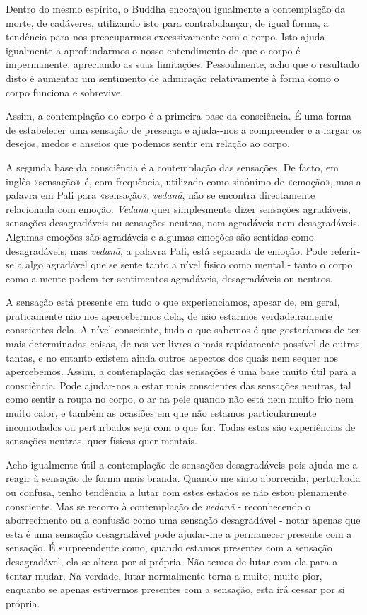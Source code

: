 Dentro do mesmo espírito, o Buddha encorajou igualmente a contemplação
da morte, de cadáveres, utilizando isto para contrabalançar, de igual
forma, a tendência para nos preocuparmos excessivamente com o corpo.
Isto ajuda igualmente a aprofundarmos o nosso entendimento de que o
corpo é impermanente, apreciando as suas limitações. Pessoalmente, acho
que o resultado disto é aumentar um sentimento de admiração
relativamente à forma como o corpo funciona e sobrevive.

Assim, a contemplação do corpo é a primeira base da consciência. É uma
forma de estabelecer uma sensação de presença e ajuda-\linebreak-nos a compreender
e a largar os desejos, medos e anseios que podemos sentir em relação ao
corpo.

A segunda base da consciência é a contemplação das sensações. De facto,
em inglês «sensação» é, com frequência, utilizado como sinónimo de
«emoção», mas a palavra em Pali para «sensação», \emph{vedanā}, não se
encontra directamente relacionada com emoção. \emph{Vedanā} quer
simplesmente dizer sensações agradáveis, sensações desagradáveis ou
sensações neutras, nem agradáveis nem desagradáveis. Algumas emoções são
agradáveis e algumas emoções são sentidas como desagradáveis, mas
\emph{vedanā}, a palavra Pali, está separada de emoção. Pode referir-se
a algo agradável que se sente tanto a nível físico como mental - tanto o
corpo como a mente podem ter sentimentos agradáveis, desagradáveis ou
neutros.

A sensação está presente em tudo o que experienciamos, apesar de, em
geral, praticamente não nos apercebermos dela, de não estarmos
verdadeiramente conscientes dela. A nível consciente, tudo o que sabemos
é que gostaríamos de ter mais determinadas coisas, de nos ver livres o
mais rapidamente possível de outras tantas, e no entanto existem ainda
outros aspectos dos quais nem sequer nos apercebemos. Assim, a
contemplação das sensações é uma base muito útil para a consciência.
Pode ajudar-nos a estar mais conscientes das sensações neutras, tal como
sentir a roupa no corpo, o ar na pele quando não está nem muito frio nem
muito calor, e também as ocasiões em que não estamos particularmente
incomodados ou perturbados seja com o que for. Todas estas são
experiências de sensações neutras, quer físicas quer mentais.

Acho igualmente útil a contemplação de sensações desagradáveis pois
ajuda-me a reagir à sensação de forma mais branda. Quando me sinto
aborrecida, perturbada ou confusa, tenho tendência a lutar com estes
estados se não estou plenamente consciente. Mas se recorro à
contemplação de \emph{vedanā} - reconhecendo o aborrecimento ou a
confusão como uma sensação desagradável - notar apenas que esta é uma
sensação desagradável pode ajudar-me a permanecer presente com a
sensação. É surpreendente como, quando estamos presentes com a sensação
desagradável, ela se altera por si própria. Não temos de lutar com ela
para a tentar mudar. Na verdade, lutar normalmente torna-a muito, muito
pior, enquanto se apenas estivermos presentes com a sensação, esta irá
cessar por si própria.

